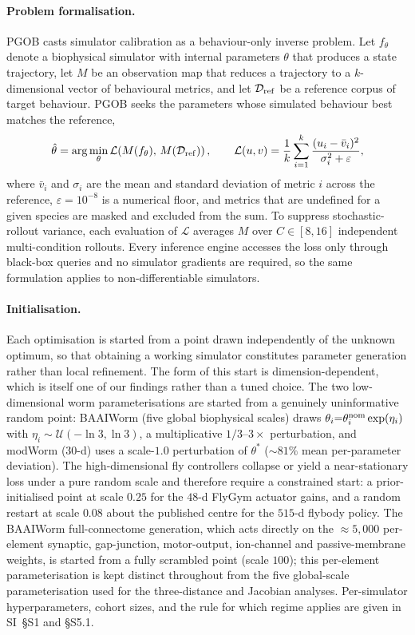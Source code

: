 \documentclass[11pt]{article}
\begin{document}
\paragraph{Problem formalisation.} PGOB casts simulator calibration as a behaviour-only inverse problem. Let $f_\theta$ denote a biophysical simulator with internal parameters $\theta$ that produces a state trajectory, let $M$ be an observation map that reduces a trajectory to a $k$-dimensional vector of behavioural metrics, and let $\mathcal{D}_{\rm ref}$ be a reference corpus of target behaviour. PGOB seeks the parameters whose simulated behaviour best matches the reference,
\begin{equation*}
\hat\theta=\arg\min_\theta \mathcal{L}\!\left(M(f_\theta),\,M(\mathcal{D}_{\rm ref})\right),\qquad
\mathcal{L}(u,v)=\frac{1}{k}\sum_{i=1}^{k}\frac{(u_i-\bar v_i)^2}{\sigma_i^2+\varepsilon},
\end{equation*}
where $\bar v_i$ and $\sigma_i$ are the mean and standard deviation of metric $i$ across the reference, $\varepsilon{=}10^{-8}$ is a numerical floor, and metrics that are undefined for a given species are masked and excluded from the sum. To suppress stochastic-rollout variance, each evaluation of $\mathcal{L}$ averages $M$ over $C\in[8,16]$ independent multi-condition rollouts. Every inference engine accesses the loss only through black-box queries and no simulator gradients are required, so the same formulation applies to non-differentiable simulators.

\paragraph{Initialisation.} Each optimisation is started from a point drawn independently of the unknown optimum, so that obtaining a working simulator constitutes parameter generation rather than local refinement. The form of this start is dimension-dependent, which is itself one of our findings rather than a tuned choice. The two low-dimensional worm parameterisations are started from a genuinely uninformative random point: BAAIWorm (five global biophysical scales) draws $\theta_i{=}\theta_i^{\rm nom}\exp(\eta_i)$ with $\eta_i\sim\mathcal{U}(-\ln3,\ln3)$, a multiplicative $1/3$--$3\times$ perturbation, and modWorm ($30$-d) uses a scale-$1.0$ perturbation of $\theta^{*}$ ($\sim81\%$ mean per-parameter deviation). The high-dimensional fly controllers collapse or yield a near-stationary loss under a pure random scale and therefore require a constrained start: a prior-initialised point at scale $0.25$ for the $48$-d FlyGym actuator gains, and a random restart at scale $0.08$ about the published centre for the $515$-d flybody policy. The BAAIWorm full-connectome generation, which acts directly on the $\approx5{,}000$ per-element synaptic, gap-junction, motor-output, ion-channel and passive-membrane weights, is started from a fully scrambled point (scale $100$); this per-element parameterisation is kept distinct throughout from the five global-scale parameterisation used for the three-distance and Jacobian analyses. Per-simulator hyperparameters, cohort sizes, and the rule for which regime applies are given in SI~\S S1 and \S S5.1.
\end{document}

